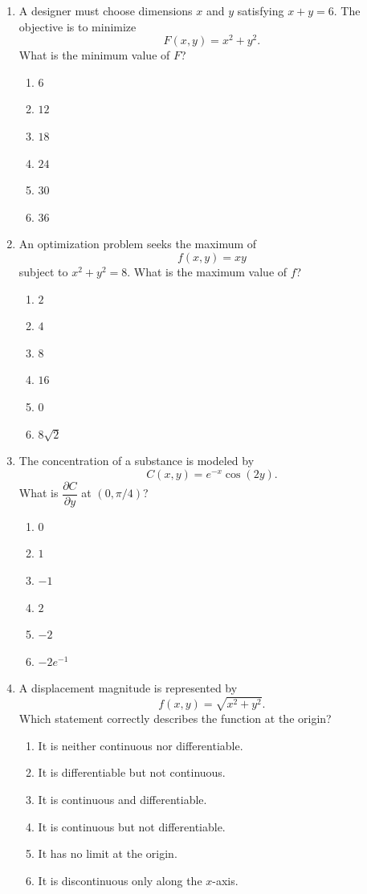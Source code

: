 \documentclass[a4paper,12pt]{article}
\theoremstyle{mystyle}
\numberwithin{equation}{section}
\numberwithin{theorem}{section}
\numberwithin{proposition}{section}
\numberwithin{example}{section}
\numberwithin{remark}{section}
\numberwithin{lemma}{section}
\numberwithin{corollary}{section}
\numberwithin{definition}{section}
\begin{document}
\begin{enumerate}
\item A designer must choose dimensions $x$ and $y$ satisfying
$x+y=6$. The objective is to minimize
\[
    F(x,y)=x^2+y^2.
\]
What is the minimum value of $F$?
\begin{enumerate}
    \item $6$
    \item $12$
    \item $18$
    \item $24$
    \item $30$
    \item $36$
\end{enumerate}

\item An optimization problem seeks the maximum of
\[
    f(x,y)=xy
\]
subject to $x^2+y^2=8$. What is the maximum value of $f$?
\begin{enumerate}
    \item $2$
    \item $4$
    \item $8$
    \item $16$
    \item $0$
    \item $8\sqrt{2}$
\end{enumerate}

\item The concentration of a substance is modeled by
\[
    C(x,y)=e^{-x}\cos(2y).
\]
What is $\dfrac{\partial C}{\partial y}$ at $(0,\pi/4)$?
\begin{enumerate}
    \item $0$
    \item $1$
    \item $-1$
    \item $2$
    \item $-2$
    \item $-2e^{-1}$
\end{enumerate}

\item A displacement magnitude is represented by
\[
    f(x,y)=\sqrt{x^2+y^2}.
\]
Which statement correctly describes the function at the origin?
\begin{enumerate}
    \item It is neither continuous nor differentiable.
    \item It is differentiable but not continuous.
    \item It is continuous and differentiable.
    \item It is continuous but not differentiable.
    \item It has no limit at the origin.
    \item It is discontinuous only along the $x$-axis.
\end{enumerate}


\end{enumerate}
\end{document}
